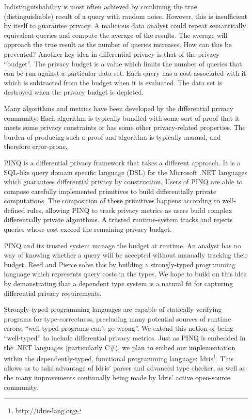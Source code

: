 \documentclass[12pt]{article}
\begin{document}
Indistinguishability is most often achieved by combining the true (distinguishable) result of a query with random noise.
However, this is insufficient by itself to guarantee privacy.
A malicious data analyst could repeat semantically equivalent queries and compute the average of the results.
The average will approach the true result as the number of queries increases.
How can this be prevented?
Another key idea in differential privacy is that of the privacy ``budget''.
The privacy budget is a value which limits the number of queries that can be run against a particular data set.
Each query has a cost associated with it which is subtracted from the budget when it is evaluated.
The data set is destroyed when the privacy budget is depleted.

Many algorithms and metrics have been developed by the differential privacy community.
Each algorithm is typically bundled with some sort of proof that it meets some privacy constraints or has some other privacy-related properties.
The burden of producing such a proof and algorithm is typically manual, and therefore error-prone.

PINQ\cite{conf/sigmod/McSherry09} is a differential privacy framework that takes a different approach.
It is a SQL-like query domain specific language (DSL) for the Microsoft .NET languages which guarantees differential privacy by construction.
Users of PINQ are able to compose carefully implemented primitives to build differentially private computations.
The composition of these primitives happens according to well-defined rules, allowing PINQ to track privacy metrics as users build complex differentially private algorithms.
A trusted runtime-system tracks and rejects queries whose cost exceed the remaining privacy budget.

PINQ and its trusted system manage the budget at runtime.
An analyst has no way of knowing whether a query will be accepted without manually tracking their budget.
Reed and Pierce\cite{conf/icfp/ReedP10} solve this by building a strongly-typed programming language which represents query costs in the types.
We hope to build on this idea by demonstrating that a dependent type system is a natural fit for capturing differential privacy requirements.

Strongly-typed programming languages are capable of statically verifying programs for type-correctness, precluding many potential sources of runtime errors: ``well-typed programs can't go wrong''.
We extend this notion of being ``well-typed'' to include differential privacy metrics.
Just as PINQ is embedded in the .NET languages (particularly C\#), we plan to embed our implementation within the dependently-typed, functional programming language: Idris\footnote{http://idris-lang.org}.
This allows us to take advantage of Idris' parser and advanced type checker, as well as the many improvements continually being made by Idris' active open-source community.
\end{document}
